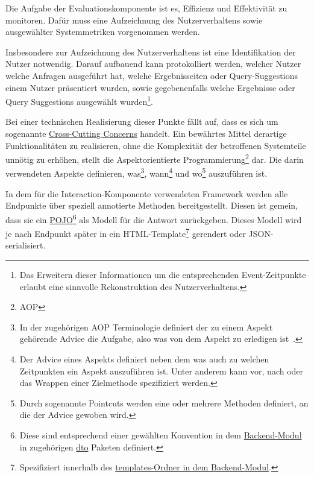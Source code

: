 Die Aufgabe der Evaluationskomponente ist es, Effizienz und Effektivität zu monitoren.
Dafür muss eine Aufzeichnung des Nutzerverhaltens sowie ausgewählter Systemmetriken vorgenommen werden.

Insbesondere zur Aufzeichnung des Nutzerverhaltens ist eine Identifikation der Nutzer notwendig.
Darauf aufbauend kann protokolliert werden, welcher Nutzer welche Anfragen ausgeführt
hat, welche Ergebnisseiten oder Query-Suggestions einem Nutzer präsentiert wurden,
sowie gegebenenfalls welche Ergebnisse oder Query Suggestions ausgewählt
wurden\footnote{Das Erweitern dieser Informationen um die entsprechenden Event-Zeitpunkte erlaubt eine
sinnvolle Rekonstruktion des Nutzerverhaltens.}.

Bei einer technischen Realisierung dieser Punkte fällt auf,
dass es sich um sogenannte \href{https://de.wikipedia.org/wiki/Cross-Cutting_Concern}{Cross-Cutting Concerns}
handelt. Ein bewährtes Mittel derartige Funktionalitäten zu realisieren, ohne die
Komplexität der betroffenen Systemteile unnötig zu erhöhen,
stellt die Aspektorientierte Programmierung\footnote{AOP} dar\cite{spring.chap1.1}.
Die darin verwendeten Aspekte definieren,
was\footnote{In der zugehörigen AOP Terminologie definiert der zu einem Aspekt gehörende Advice die Aufgabe,
also was von dem Aspekt zu erledigen ist~\cite{spring.chap4.1}.}, wann\footnote{Der Advice eines Aspekts definiert 
neben dem was auch zu welchen Zeitpunkten ein Aspekt auszuführen ist.
Unter anderem kann vor, nach oder das Wrappen einer Zielmethode spezifiziert werden\cite{spring.chap4.1}.}
und wo\footnote{Durch sogenannte Pointcuts werden eine oder mehrere Methoden definiert,
an die der Advice gewoben wird\cite{spring.chap4.1}.} auszuführen ist\cite{spring.chap4.1}.

In dem für die Interaction-Komponente verwendeten Framework werden alle Endpunkte über speziell annotierte Methoden
bereitgestellt.
Diesen ist gemein, dass sie ein
\href{https://de.wikipedia.org/wiki/Plain_Old_Java_Object}{POJO}\footnote{Diese sind 
entsprechend einer gewählten Konvention in dem 
\href{https://github.com/mam10eks/search-homepage-of-university-leipzig/tree/master/search-engine-backend}{Backend-Modul}
in zugehörigen \href{https://de.wikipedia.org/wiki/Transferobjekt}{dto} Paketen definiert.}
als Modell für die Antwort zurückgeben. 
Dieses Modell wird je nach Endpunkt später in ein HTML-Template\footnote{Spezifiziert innerhalb des 
\href{https://github.com/mam10eks/search-homepage-of-university-leipzig/tree/master/search-engine-backend/src/main/resources/templates}
{templates-Ordner in dem Backend-Modul}.} gerendert oder
JSON-serialisiert.

